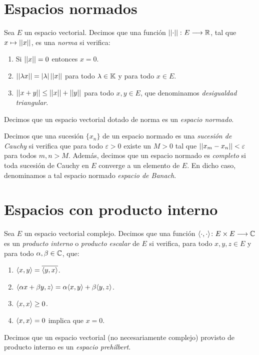 \section{Espacios normados}

\begin{definition} \label{def:def23} Sea $E$ un espacio vectorial. Decimos que una función $\left|\left|\cdot\right|\right|\colon E\longrightarrow \mathbb{R}$, tal que $x\mapsto\left|\left|x\right|\right|$, es una \textit{norma} si verifica:
\begin{enumerate}[label=\alph*)]
\item Si $\left|\left|x\right|\right|=0$ entonces $x=0$.
\item $\left|\left|\lambda x\right|\right|=|\lambda|\left|\left|x\right|\right|$ para todo $\lambda\in\mathbb{K}$ y para todo $x\in E$.
\item $\left|\left|x+y\right|\right|\leq \left|\left|x\right|\right| + \left|\left|y\right|\right|$ para todo $x,y\in E$, que denominamos \textit{desigualdad triangular}.
\end{enumerate}
Decimos que  un espacio vectorial dotado de norma es un \textit{espacio normado}.

Decimos que una sucesión $\{x_n\}$ de un espacio normado  es una \textit{sucesión de Cauchy} si verifica que para todo $\varepsilon>0$ existe un $M>0$ tal que $\left|\left|x_m-x_n\right|\right|<\varepsilon$ para todos $m,n>M$.
%
Además, decimos que  un espacio normado es \textit{completo} si toda sucesión de Cauchy en $E$ converge a un elemento de $E$. En dicho caso, denominamos a tal espacio normado \textit{espacio de Banach}.
\end{definition}

\section{Espacios con producto interno}

\begin{definition} Sea $E$ un espacio vectorial complejo. Decimos que una función $\langle\cdot,\cdot\rangle\colon E\times E\longrightarrow \mathbb{C}$ es un \textit{producto interno} o \textit{producto escalar} de $E$ si verifica, para todo $x,y,z\in E$ y para todo $\alpha,\beta\in\mathbb{C}$, que:
\begin{enumerate}[label=\alph*)]
\item $\langle x,y\rangle=\overline{\langle y,x\rangle}$.
\item $\langle\alpha x + \beta y,z\rangle= \alpha \langle x,y\rangle + \beta \langle y,z\rangle$.
\item $\langle x,x\rangle\geq 0$.
\item $\langle x,x\rangle= 0$ implica que $x=0$.
\end{enumerate}

Decimos que un espacio vectorial (no necesariamente complejo) provisto de producto interno es un  \textit{espacio prehilbert}.
\end{definition}

